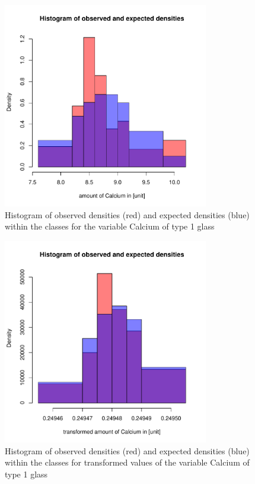 \documentclass[a4paper, 12pt, titlepage, headsepline, listof = totoc, bibliography = totoc, numbers = noenddot]{scrartcl}
\begin{document}
\begin{figure}[h!]
\centering
\includegraphics[width=0.8\textwidth]{report-chisqType1Ca}
\caption{Histogram of observed densities (red) and expected densities (blue) within the classes for the variable Calcium of type 1 glass}
\label{fig:chisqType1Ca}
\end{figure}

\begin{figure}[h!]
\centering
\includegraphics[width=0.8\textwidth]{report-chisqType1CaTrans}
\caption{Histogram of observed densities (red) and expected densities (blue) within the classes for transformed values of the variable Calcium of type 1 glass}
\label{fig:chisqType1CaTrans}
\end{figure}
\end{document}
